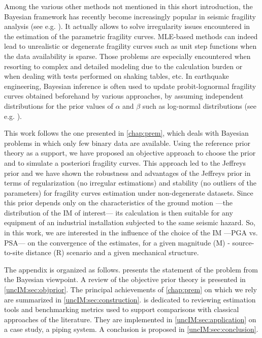 Among the various other methods not mentioned in this short introduction, the Bayesian framework has recently become increasingly popular in seismic fragility analysis (see e.g. \cite{gardoni_probabilistic_2002,wang_seismic_2018,katayama_bayesian-estimation-based_2021,koutsourelakis_assessing_2010,damblin_approche_2014,tadinada_structural_2017,kwag_computationally_2018,jeon_parameterized_2019,tabandeh_physics-based_2020}). 
It actually allows to solve irregularity issues encountered in the estimation of the parametric fragility curves. MLE-based methods can indeed lead to unrealistic or degenerate fragility curves such as unit step functions when the data availability is sparse. Those problems are especially encountered when resorting to complex and detailed modeling due to the calculation burden or when dealing with tests performed on shaking tables, etc. In earthquake engineering, Bayesian inference is often used to update probit-lognormal fragility curves obtained beforehand by various approaches, by assuming independent distributions for the prior values of $\alpha$ and $\beta$ such as log-normal distributions (see e.g. \cite{tadinada_structural_2017,kwag_computationally_2018,wang_seismic_2018,katayama_bayesian-estimation-based_2021,straub_improved_2008}).

This work follows the one presented in \cref{chap:prem}, which deals with Bayesian problems in which only few binary data are available. Using the reference prior theory as a support, we have proposed an objective approach to choose the prior and to simulate a posteriori fragility curves. This approach led to the Jeffreys prior and we have shown the robustness and advantages of the Jeffreys prior in terms of regularization (no irregular estimations) and stability (no outliers of the parameters) for fragility curves estimation under non-degenerate datasets. Since this prior depends only on the characteristics of the ground motion ---the distribution of the IM of interest--- its calculation is then suitable for any equipment of an industrial installation subjected to the same seismic hazard. So, in this work, we are interested in the influence of the choice of the IM ---PGA vs. PSA--- on the convergence of the estimates, for a given magnitude (M) - source-to-site distance (R) scenario and a given mechanical structure.

The appendix is organized as follows.  presents the statement of the problem from the Bayesian viewpoint. A review of the objective prior theory is presented in \cref{uncIM:sec:objprior}. The principal achievements of \cref{chap:prem} on which we rely are summarized in \cref{uncIM:sec:construction}.  is dedicated to reviewing estimation tools and benchmarking metrics used to support comparisons with classical approaches of the literature. They are implemented in \cref{uncIM:sec:application} on a case study, a piping system. A conclusion is proposed in \cref{uncIM:sec:conclusion}.





